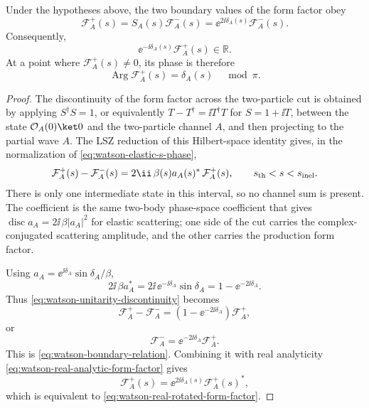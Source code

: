 \begin{proposition}
\label{prop:watson-theorem}
Under the hypotheses above, the two boundary values of the form factor obey
\begin{equation}
  \mathcal F_A^+(s)=S_A(s)\mathcal F_A^-(s)
  =
  \ee^{2\ii\delta_A(s)}\mathcal F_A^-(s).
  \label{eq:watson-boundary-relation}
\end{equation}
Consequently,
\begin{equation}
  \ee^{-\ii\delta_A(s)}\mathcal F_A^+(s)\in\mathbb R .
  \label{eq:watson-real-rotated-form-factor}
\end{equation}
At a point where \(\mathcal F_A^+(s)\ne0\), its phase is therefore
\[
  \operatorname{Arg}\mathcal F_A^+(s)
  =
  \delta_A(s)\quad \bmod \pi .
\]
\end{proposition}

\begin{proof}
The discontinuity of the form factor across the two-particle cut is obtained
by applying \(S^\dagger S=1\), or equivalently
\(T-T^\dagger=\ii T^\dagger T\) for \(S=1+\ii T\), between the state
\(\mathcal O_A(0)\ket 0\) and the two-particle channel \(A\), and then
projecting to the partial wave \(A\).  The LSZ reduction of this Hilbert-space
identity gives, in the normalization of
\eqref{eq:watson-elastic-s-phase},
\begin{equation}
  \mathcal F_A^+(s)-\mathcal F_A^-(s)
  =
  2\ii\,\beta(s)a_A(s)^*\,\mathcal F_A^+(s),
  \qquad s_{\rm th}<s<s_{\rm inel}.
  \label{eq:watson-unitarity-discontinuity}
\end{equation}
There is only one intermediate state in this interval, so no channel sum is
present.  The coefficient is the same two-body phase-space coefficient that
gives \(\operatorname{disc}a_A=2\ii\,\beta |a_A|^2\) for elastic scattering;
one side of the cut carries the complex-conjugated scattering amplitude, and
the other carries the production form factor.

Using \(a_A=\ee^{\ii\delta_A}\sin\delta_A/\beta\),
\[
  2\ii\,\beta a_A^*
  =
  2\ii\,\ee^{-\ii\delta_A}\sin\delta_A
  =
  1-\ee^{-2\ii\delta_A}.
\]
Thus \eqref{eq:watson-unitarity-discontinuity} becomes
\[
  \mathcal F_A^+-\mathcal F_A^-
  =
  (1-\ee^{-2\ii\delta_A})\mathcal F_A^+,
\]
or
\[
  \mathcal F_A^-=\ee^{-2\ii\delta_A}\mathcal F_A^+ .
\]
This is \eqref{eq:watson-boundary-relation}.  Combining it with real
analyticity \eqref{eq:watson-real-analytic-form-factor} gives
\[
  \mathcal F_A^+(s)
  =
  \ee^{2\ii\delta_A(s)}\mathcal F_A^+(s)^*,
\]
which is equivalent to
\eqref{eq:watson-real-rotated-form-factor}.
\end{proof}

